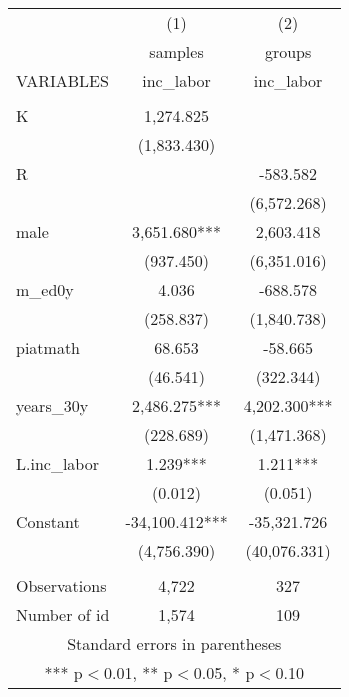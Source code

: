 \begin{tabular}{lcc} \hline
 & (1) & (2) \\
 & samples & groups \\
VARIABLES & inc\_labor & inc\_labor \\ \hline
 &  &  \\
K & 1,274.825 &  \\
 & (1,833.430) &  \\
R &  & -583.582 \\
 &  & (6,572.268) \\
male & 3,651.680*** & 2,603.418 \\
 & (937.450) & (6,351.016) \\
m\_ed0y & 4.036 & -688.578 \\
 & (258.837) & (1,840.738) \\
piatmath & 68.653 & -58.665 \\
 & (46.541) & (322.344) \\
years\_30y & 2,486.275*** & 4,202.300*** \\
 & (228.689) & (1,471.368) \\
L.inc\_labor & 1.239*** & 1.211*** \\
 & (0.012) & (0.051) \\
Constant & -34,100.412*** & -35,321.726 \\
 & (4,756.390) & (40,076.331) \\
 &  &  \\
Observations & 4,722 & 327 \\
 Number of id & 1,574 & 109 \\ \hline
\multicolumn{3}{c}{ Standard errors in parentheses} \\
\multicolumn{3}{c}{ *** p$<$0.01, ** p$<$0.05, * p$<$0.10} \\
\end{tabular}
